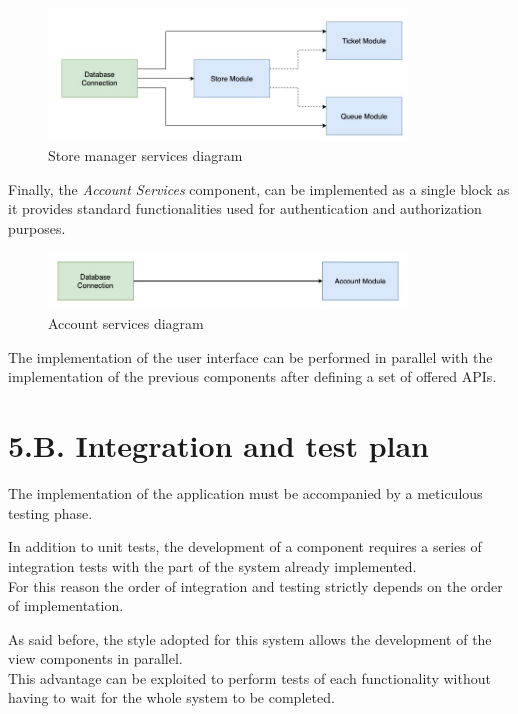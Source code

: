 \begin{figure}[H]
\centering
\includegraphics[width=0.85\textwidth]{implementation_diagrams/store_manager_services_diagram}
\caption{Store manager services diagram}
\end{figure}

Finally, the \emph{Account Services} component, can be implemented as a single block as it provides standard functionalities used for authentication and authorization purposes.

\begin{figure}[H]
\centering
\includegraphics[width=0.85\textwidth]{implementation_diagrams/account_services_diagram}
\caption{Account services diagram}
\end{figure}

The implementation of the user interface can be performed in parallel with the implementation of the previous components after defining a set of offered APIs.

\section{5.B. Integration and test plan}

The implementation of the application must be accompanied by a meticulous testing phase.

In addition to unit tests, the development of a component requires a series of integration tests with the part of the system already implemented.\\
For this reason the order of integration and testing strictly depends on the order of implementation.

As said before, the style adopted for this system allows the development of the view components in parallel.\\
This advantage can be exploited to perform tests of each functionality without having to wait for the whole system to be completed.


